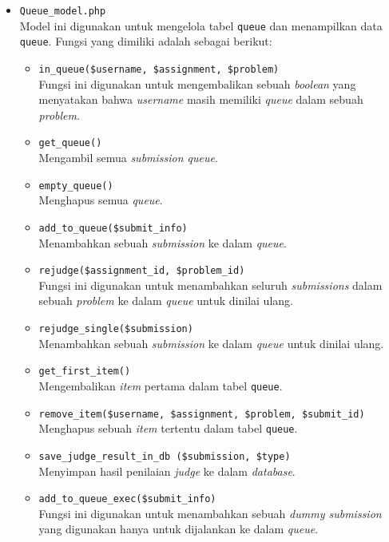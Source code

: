 \documentclass[a4paper,twoside]{article}
\begin{document}
\begin{enumerate}
\begin{itemize}
\begin{itemize}
			            \item \verb|Queue_model.php| \\
			                  Model ini digunakan untuk mengelola tabel \verb|queue| dan menampilkan data \verb|queue|. Fungsi yang dimiliki adalah sebagai berikut:

			                  \begin{itemize}
				                  \item \verb|in_queue($username, $assignment, $problem)| \\
				                        Fungsi ini digunakan untuk mengembalikan sebuah \textit{boolean} yang menyatakan bahwa \textit{username} masih memiliki \textit{queue} dalam sebuah \textit{problem}.
				                  \item \verb|get_queue()| \\
				                        Mengambil semua \textit{submission queue}.
				                  \item \verb|empty_queue()| \\
				                        Menghapus semua \textit{queue}.
				                  \item \verb|add_to_queue($submit_info)| \\
				                        Menambahkan sebuah \textit{submission} ke dalam \textit{queue}.
				                  \item \verb|rejudge($assignment_id, $problem_id)| \\
				                        Fungsi ini digunakan untuk menambahkan seluruh \textit{submissions} dalam sebuah \textit{problem} ke dalam \textit{queue} untuk dinilai ulang.
				                  \item \verb|rejudge_single($submission)| \\
				                        Menambahkan sebuah \textit{submission} ke dalam \textit{queue} untuk dinilai ulang.
				                  \item \verb|get_first_item()| \\
				                        Mengembalikan \textit{item} pertama dalam tabel \verb|queue|.
				                  \item \verb|remove_item($username, $assignment, $problem, $submit_id)| \\
				                        Menghapus sebuah \textit{item} tertentu dalam tabel \verb|queue|.
				                  \item \verb|save_judge_result_in_db ($submission, $type)| \\
				                        Menyimpan hasil penilaian \textit{judge} ke dalam \textit{database}.
				                  \item \verb|add_to_queue_exec($submit_info)| \\
				                        Fungsi ini digunakan untuk menambahkan sebuah \textit{dummy submission} yang digunakan hanya untuk dijalankan ke dalam \textit{queue}.
			                  \end{itemize}


\end{itemize}
\end{itemize}
\end{enumerate}
\end{document}
